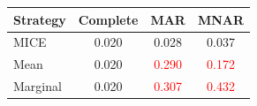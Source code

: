 \begin{tabular}{lccc}
    \toprule
    Strategy  & Complete & MAR                    & MNAR                   \\
    \midrule
    MICE      & 0.020   & 0.028                 & 0.037                 \\
    Mean      & 0.020   & \textcolor{red}{0.290}& \textcolor{red}{0.172}\\
    Marginal  & 0.020   & \textcolor{red}{0.307}& \textcolor{red}{0.432}\\
    \bottomrule
\end{tabular}
